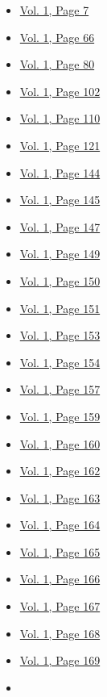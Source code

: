 \begin{itemize}
  \begin{itemize}
  \tightlist
  \item
    \protect\hyperlink{g-page-15}{Vol. 1, Page 7}
  \item
    \protect\hyperlink{g-page-74}{Vol. 1, Page 66}
  \item
    \protect\hyperlink{g-page-88}{Vol. 1, Page 80}
  \item
    \protect\hyperlink{g-page-110}{Vol. 1, Page 102}
  \item
    \protect\hyperlink{g-page-118}{Vol. 1, Page 110}
  \item
    \protect\hyperlink{g-page-129}{Vol. 1, Page 121}
  \item
    \protect\hyperlink{g-page-152}{Vol. 1, Page 144}
  \item
    \protect\hyperlink{g-page-153}{Vol. 1, Page 145}
  \item
    \protect\hyperlink{g-page-155}{Vol. 1, Page 147}
  \item
    \protect\hyperlink{g-page-157}{Vol. 1, Page 149}
  \item
    \protect\hyperlink{g-page-158}{Vol. 1, Page 150}
  \item
    \protect\hyperlink{g-page-159}{Vol. 1, Page 151}
  \item
    \protect\hyperlink{g-page-161}{Vol. 1, Page 153}
  \item
    \protect\hyperlink{g-page-162}{Vol. 1, Page 154}
  \item
    \protect\hyperlink{g-page-165}{Vol. 1, Page 157}
  \item
    \protect\hyperlink{g-page-167}{Vol. 1, Page 159}
  \item
    \protect\hyperlink{g-page-168}{Vol. 1, Page 160}
  \item
    \protect\hyperlink{g-page-170}{Vol. 1, Page 162}
  \item
    \protect\hyperlink{g-page-171}{Vol. 1, Page 163}
  \item
    \protect\hyperlink{g-page-172}{Vol. 1, Page 164}
  \item
    \protect\hyperlink{g-page-173}{Vol. 1, Page 165}
  \item
    \protect\hyperlink{g-page-174}{Vol. 1, Page 166}
  \item
    \protect\hyperlink{g-page-175}{Vol. 1, Page 167}
  \item
    \protect\hyperlink{g-page-176}{Vol. 1, Page 168}
  \item
    \protect\hyperlink{g-page-177}{Vol. 1, Page 169}
  \item

\end{itemize}
\end{itemize}
